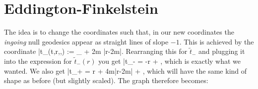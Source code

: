 \section{Eddington-Finkelstein}

The idea is to change the coordinates such that, in our new coordinates the \textit{ingoing} null geodesics appear as straight lines of slope $-1$. This is achieved by the coordinate
\bse 
    \bar{t}_{\pm}(t,r,\theta,\varphi) := _{\pm} + 2m \ln|r-2m|.
\ese 
Rearranging this for $\widetilde{t}_-$ and plugging it into the expression for $\widetilde{t}_-(r)$ you get 
\bse 
    \bar{t}_- = -r + ,
\ese
which is exactly what we wanted. We also get 
\bse 
    \bar{t}_+ = r + 4m\ln|r-2m| + ,
\ese 
which will have the same kind of shape as before (but slightly scaled). The graph therefore becomes: 

